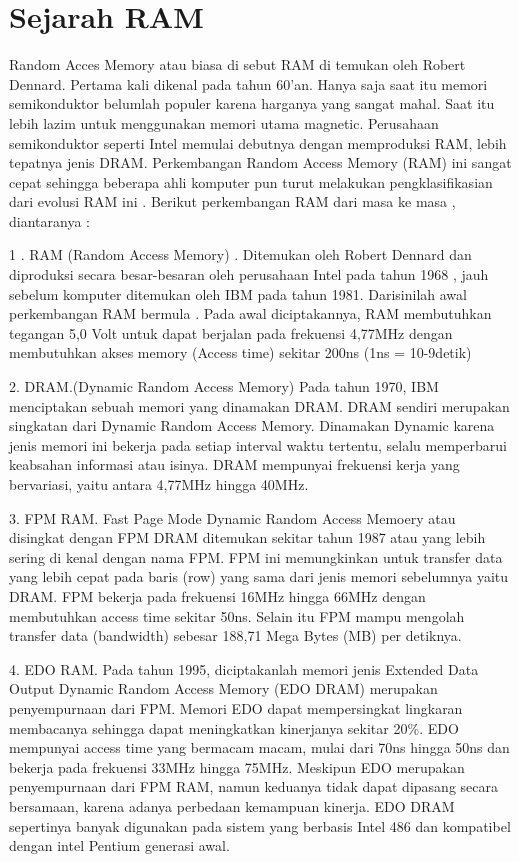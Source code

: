 \section{Sejarah RAM}
Random Acces Memory atau biasa di sebut RAM di temukan oleh Robert Dennard.
Pertama kali dikenal pada tahun 60'an. Hanya saja saat itu memori semikonduktor belumlah populer karena harganya yang sangat mahal. Saat itu lebih lazim untuk menggunakan memori utama magnetic. Perusahaan semikonduktor seperti Intel memulai debutnya dengan memproduksi RAM, lebih tepatnya jenis DRAM.
Perkembangan Random Access Memory (RAM) ini sangat cepat sehingga beberapa ahli komputer pun turut melakukan pengklasifikasian dari evolusi RAM ini . 
Berikut perkembangan RAM dari masa ke masa , diantaranya :

1 . RAM (Random Access Memory) . Ditemukan oleh Robert Dennard dan diproduksi secara besar-besaran oleh perusahaan Intel pada tahun 1968 , 
jauh sebelum komputer ditemukan oleh IBM pada tahun 1981. Darisinilah awal perkembangan RAM bermula . Pada awal diciptakannya, 
RAM membutuhkan tegangan 5,0 Volt untuk dapat berjalan pada frekuensi 4,77MHz dengan membutuhkan akses memory (Access time) sekitar 200ns (1ns = 10-9detik) 

2.	DRAM.(Dynamic Random Access Memory) Pada tahun 1970, IBM menciptakan sebuah memori yang dinamakan DRAM. DRAM sendiri merupakan singkatan dari Dynamic Random Access Memory. Dinamakan Dynamic karena jenis memori ini bekerja pada setiap interval waktu tertentu, selalu memperbarui keabsahan informasi atau isinya. DRAM mempunyai frekuensi kerja yang bervariasi, yaitu antara 4,77MHz hingga 40MHz. 

3.	FPM RAM. Fast Page Mode Dynamic Random Access Memoery atau disingkat dengan FPM DRAM ditemukan sekitar tahun 1987 atau yang lebih sering di kenal dengan nama FPM. FPM ini memungkinkan untuk transfer data yang lebih cepat pada baris (row) yang sama dari jenis memori sebelumnya yaitu DRAM. FPM bekerja pada frekuensi 16MHz hingga 66MHz dengan membutuhkan access time sekitar 50ns. Selain itu FPM mampu mengolah transfer data (bandwidth) sebesar 188,71 Mega Bytes (MB) per detiknya.

4.	EDO RAM. Pada tahun 1995, diciptakanlah memori jenis Extended Data Output Dynamic Random Access Memory (EDO DRAM) merupakan penyempurnaan dari FPM. Memori EDO dapat mempersingkat lingkaran membacanya sehingga dapat meningkatkan kinerjanya sekitar 20\%. EDO mempunyai access time yang bermacam macam, mulai dari 70ns hingga 50ns dan bekerja  pada frekuensi 33MHz hingga 75MHz. Meskipun EDO merupakan penyempurnaan dari FPM RAM, namun keduanya tidak dapat dipasang secara bersamaan, karena adanya perbedaan kemampuan kinerja. EDO DRAM sepertinya banyak digunakan pada sistem yang berbasis Intel 486 dan kompatibel dengan intel Pentium generasi awal.

